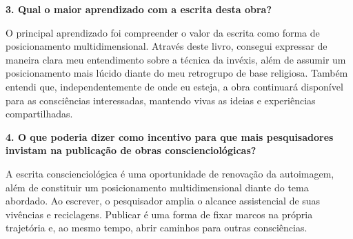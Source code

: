\documentclass{gescons}
\begin{document}
\begin{multicols}{2}
\textbf{3. Qual o maior aprendizado com a escrita desta obra?}

O principal aprendizado foi compreender o valor da escrita como forma de posicionamento multidimensional. Através deste livro, consegui expressar de maneira clara meu entendimento sobre a técnica da invéxis, além de assumir um posicionamento mais lúcido diante do meu retrogrupo de base religiosa. Também entendi que, independentemente de onde eu esteja, a obra continuará disponível para as consciências interessadas, mantendo vivas as ideias e experiências compartilhadas.

\textbf{4. O que poderia dizer como incentivo para que mais pesquisadores invistam na publicação de obras conscienciológicas?}

A escrita conscienciológica é uma oportunidade de renovação da autoimagem, além de constituir um posicionamento multidimensional diante do tema abordado. Ao escrever, o pesquisador amplia o alcance assistencial de suas vivências e reciclagens. Publicar é uma forma de fixar marcos na própria trajetória e, ao mesmo tempo, abrir caminhos para outras consciências.
    
    
    \end{multicols}
\end{document}
